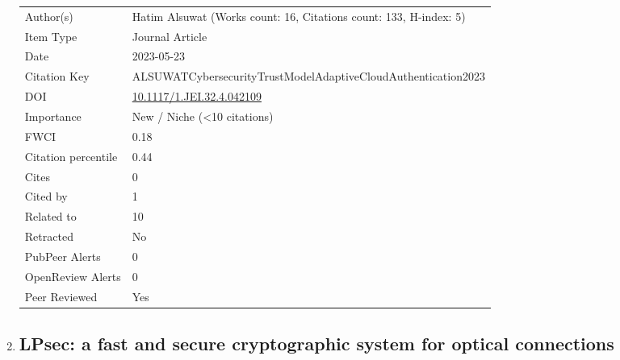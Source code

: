 \documentclass{article}
\begin{document}
\begin{enumerate}[label=\arabic*., font=\Large]
\begin{longtable}{p{} p{\contentcolwidth-2\tabcolsep}}
\toprule
Author(s) & Hatim Alsuwat (Works count: 16, Citations count: 133, H-index: 5) \\
Item Type & Journal Article \\
Date & 2023-05-23 \\
Citation Key & ALSUWATCybersecurityTrustModelAdaptiveCloudAuthentication2023 \\
DOI & \href{http://doi.org/10.1117/1.JEI.32.4.042109}{10.1117/1.JEI.32.4.042109} \\
Importance & New / Niche (<10 citations) \\
FWCI & 0.18 \\
Citation percentile & 0.44 \\
Cites & 0 \\
Cited by & 1 \\
Related to & 10 \\
Retracted & No \\
PubPeer Alerts & 0 \\
OpenReview Alerts & 0 \\
Peer Reviewed & Yes \\
\bottomrule
\end{longtable}

\item
{}\label{lpsec-a-fast-and-secure-cryptographic-system-for-optical-connections}
\hypertarget{item_IQBALLPsecFastSecureCryptographicSystemOptical2022}{}
\subsection*{LPsec: a fast and secure cryptographic system for optical connections}


\end{enumerate}
\end{document}
